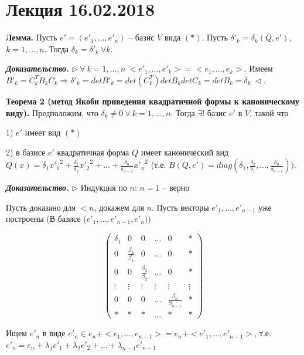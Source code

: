 \section{Лекция 16.02.2018}

\bigskip
\textbf{Лемма.} Пусть $e' = (e'_1, \dots, e'_n)$ -- базис $V$ вида $(*)$. Пусть $\delta'_k = \delta_k(Q, e')$, $k = 1, \dots, n$. Тогда $\delta_k = \delta'_k \ \forall k$.

\bigskip
\textbf{\textit{Доказательство.}} $\rhd \ \forall \ k =1, \dots, n \ <e'_1, \dots, e'_k> = <e_1, \dots, e_k>$. Имеем $B'_k = C_k^T B_k C_k \Rightarrow \delta'_k = det B'_k = det(C_k^T) det B_k det C_k = det B_k = \delta_k \ \lhd$.

\bigskip
\textbf{Теорема 2 (метод Якоби приведения квадратичной формы к каноническому виду).} Предположим, что $\delta_k \neq 0 \ \forall \ k =1, \dots, n$. Тогда $\exists !$ базис $e'$ в $V$, такой что

1) $e'$ имеет вид $(*)$

2) в базисе $e'$ квадратичная форма $Q$ имеет канонический вид $Q(x) = \delta_1 {x'_1}^2 + \frac{\delta_2}{\delta_1} {x'_2}^2 + \dots + \frac{\delta_n}{\delta_{n-1}} {x'_n}^2$ (т.е. $B(Q, e') = diag(\delta_1, \frac{\delta_2}{\delta_1}, \dots, \frac{\delta_n}{\delta_{n-1}}))$.

\bigskip
\textbf{\textit{Доказательство.}} $\rhd$ Индукция по $n$: $n = 1$ -- верно

Пусть доказано для $<n$, докажем для $n$. Пусть векторы $e'_1, \dots, e'_{n-1}$ уже построены (В базисе ($e'_1, \dots, e'_{n-1}, e'_n))$

\begin{equation*} \begin{pmatrix} \delta_1 & 0 & 0 & \dots & 0 & * \\ 0 & \frac{\beta_2}{\beta_1} & 0 & \dots & 0 & * \\ 0 & 0 & \frac{\beta_3}{\beta_2} & \dots & 0 & * \\ \vdots & \vdots & \vdots & \vdots & \vdots & \vdots \\ 0 & 0 & 0 & \dots & \frac{\beta_n}{\beta_{n-1}} & * \\ * & * & * & \dots & * & * \end{pmatrix}
\end{equation*}

\bigskip
Ищем $e'_n$ в виде $e'_n \in e_n + <e_1, \dots, e_{n-1}> = e_n + <e'_1, \dots, e'_{n-1}>$, т.е. $e'_n = e_n + \lambda_1 e'_1 + \lambda_2 e'_2 + \dots + \lambda_{n-1} e'_{n-1}$

